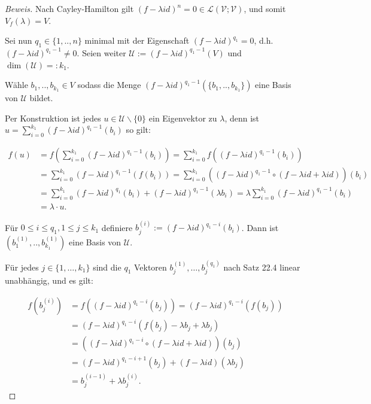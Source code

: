 \documentclass{article}
\newcommand{\LL}{\mathcal{L}}
\newcommand{\V}{\mathcal{V}}
\newcommand{\U}{\mathcal{U}}
\newcommand{\basis}[2]{b_{#1}^{({#2})}}
\newcommand{\lam}{\lambda}
\newcommand{\flam}[1]{(f-{\lambda}id)^{{#1}}}
\DeclareMathOperator{\dimension}{dim}
\begin{document}
\begin{proof}[Beweis]
  Nach Cayley-Hamilton gilt $\flam{n}=0 \in \LL(\V;\V)$, und somit $V_f(\lam)=V$.

  Sei nun $q_1 \in \{1, .., n\}$ minimal mit der Eigenschaft $(f -
  \lambda id)^{q_1}=0$, d.h. $(f-{\lambda}id)^{q_1-1}\ne0$.
  Seien weiter $\U:=(f-{\lambda}id)^{q_1-1}(V)$ und $\dimension(\U) =: k_1$.

  Wähle $b_1, .., b_{k_1}\in V$ sodass die Menge
  $(f-{\lambda}id)^{q_1-1}(\{b_1, ..,b_{k_1}\})$ eine Basis von $\U$
  bildet.

  Per Konstruktion ist jedes $u \in \U \backslash \{0\}$ ein Eigenvektor zu
  $\lambda$, denn ist $u=\sum_{i=0}^{k_1}(f-{\lambda}id)^{q_1-1}(b_i)$
  so gilt:

  \begin{align*}
    \displaystyle
    f(u) & = f(\sum_{i=0}^{k_1}(f-{\lambda}id)^{q_1-1}(b_i)) 
          = \sum_{i=0}^{k_1}f((f-{\lambda}id)^{q_1-1}(b_i)) \\
         & = \sum_{i=0}^{k_1}(f-{\lambda}id)^{q_1-1}(f(b_i)) 
          = \sum_{i=0}^{k_1}((f-{\lambda}id)^{q_1-1} \circ
           (f-{\lambda}id+{\lambda}id))(b_i) \\
         & = \sum_{i=0}^{k_1}(f-{\lambda}id)^{q_1}(b_i) +
           (f-{\lambda}id)^{q_1-1}({\lambda}b_i)
           = \lambda \sum_{i=0}^{k_1}(f-{\lambda}id)^{q_1-1}(b_i) \\
         & = \lambda \cdot u.
  \end{align*}

  Für $0 \le i \le q_1, 1 \le j \le k_1$ definiere
  $b_j^{(i)}:=(f-{\lambda}id)^{q_1-i}(b_i)$. Dann ist $(b_1^{(1)}, ..,
  b_{k_1}^{(1)})$ eine Basis von $\U$.

  Für jedes $j \in \{1, \dots ,k_1\}$ sind die $q_1$ Vektoren
  $\basis{j}{1} , \dots , \basis{j}{q_1}$ nach Satz 22.4 linear
  unabhängig, und es gilt:

  \begin{align*}
    f(\basis{j}{i}) & = f(\flam{q_1-i}(b_j)) = \flam{q_1-i}(f(b_j)) \\
                    & = \flam{q_1-i}(f(b_j) - \lam b_j + \lam b_j) \\
                    & = (\flam{q_1-i} \circ (f - \lam id + \lam id))(b_j) \\
                    & = \flam{q_1-i+1}(b_j) + (f-\lam id)(\lam b_j) \\
                    & = \basis{j}{i-1} + \lam \basis{j}{i}.
  \end{align*}


\end{proof}
\end{document}
